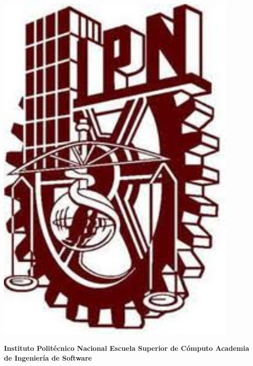 \thispagestyle{empty}

\begin{minipage}{0.15\textwidth}
	\includegraphics[width=0.9\textwidth]{portada/ipn.jpg}
\end{minipage}%
\begin{minipage}{0.65\textwidth}
\begin{center}
\large \bf Instituto Politécnico Nacional \newline
\large \bf Escuela Superior de Cómputo \newline
Academia de Ingeniería de Software
\end{center}
\end{minipage}
